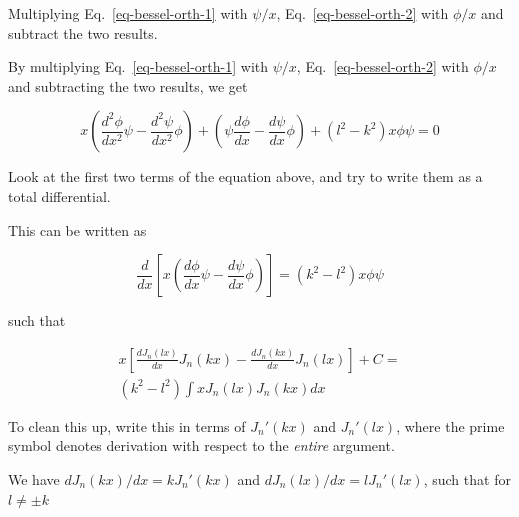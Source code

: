 \begin{cue}
Multiplying Eq.~\ref{eq-bessel-orth-1} with $\psi/x$, Eq.~\ref{eq-bessel-orth-2} with $\phi/x$ and subtract the two results.  
\end{cue}

By multiplying Eq.~\ref{eq-bessel-orth-1} with $\psi/x$, Eq.~\ref{eq-bessel-orth-2} with $\phi/x$ and subtracting the two results, we get

\begin{equation}
x \left( \frac{d^2 \phi}{dx^2}\psi - \frac{d^2 \psi}{dx^2} \phi \right) + \left(\psi \frac{d \phi}{dx}- \frac{d \psi}{dx}\phi\right) + \left(l^2 - k^2\right) x \phi \psi = 0
\end{equation}

\begin{cue}
Look at the first two terms of the equation above, and try to write them as a total differential. 
\end{cue}

This can be written as

\begin{equation}
\frac{d}{dx}\left[x \left( \frac{d \phi}{dx} \psi - \frac{d \psi}{dx} \phi\right)\right] = \left(k^2 - l^2\right) x \phi \psi
\end{equation}

such that

\begin{align}
x \left[{\frac{dJ_n(lx)}{dx}  J_n(kx) - \frac{dJ_n(kx)}{dx} J_n(lx)}\right] + C = \nonumber \\ \left(k^2 - l^2\right)\int x J_n(lx)J_n(kx)dx
\end{align}

\begin{cue}
To clean this up, write this in terms of $J_n'(kx)$ and  $J_n'(lx)$, where the prime symbol denotes derivation with respect to the \emph{entire} argument. 
\end{cue}

We have $dJ_n(kx)/dx = kJ_n'(kx)$ and $dJ_n(lx)/dx = lJ_n'(lx)$, such that for $l \ne \pm k$

